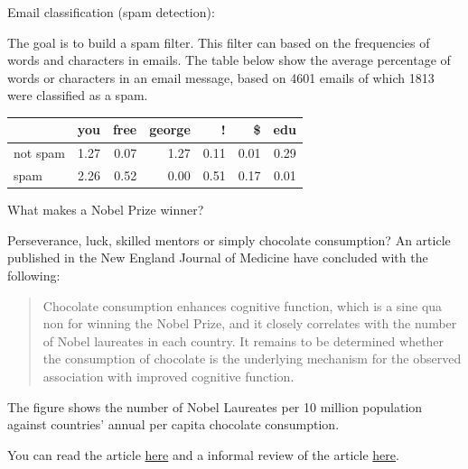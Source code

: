 \documentclass[ignorenonframetext,]{beamer}
\begin{document}
\begin{frame}

\begin{block}{Email classification (spam detection):}

The goal is to build a spam filter. This filter can based on the
frequencies of words and characters in emails. The table below show the
average percentage of words or characters in an email message, based on
4601 emails of which 1813 were classified as a spam.

\begin{longtable}[]{@{}lrrrrrr@{}}
\toprule
& you & free & george & ! & \$ & edu\tabularnewline
\midrule
\endhead
not spam & 1.27 & 0.07 & 1.27 & 0.11 & 0.01 & 0.29\tabularnewline
spam & 2.26 & 0.52 & 0.00 & 0.51 & 0.17 & 0.01\tabularnewline
\bottomrule
\end{longtable}

\end{block}

\end{frame}

\begin{frame}

\begin{block}{What makes a Nobel Prize winner?}

Perseverance, luck, skilled mentors or simply chocolate consumption? An
article published in the New England Journal of Medicine have concluded
with the following:

\begin{quote}
Chocolate consumption enhances cognitive function, which is a sine qua
non for winning the Nobel Prize, and it closely correlates with the
number of Nobel laureates in each country. It remains to be determined
whether the consumption of chocolate is the underlying mechanism for the
observed association with improved cognitive function.
\end{quote}

The figure shows the number of Nobel Laureates per 10 million population
against countries' annual per capita chocolate consumption.

You can read the article
\href{http://www.nejm.org/doi/full/10.1056/NEJMon1211064}{here} and a
informal review of the article
\href{https://blogs.scientificamerican.com/the-curious-wavefunction/chocolate-consumption-and-nobel-prizes-a-bizarre-juxtaposition-if-there-ever-was-one/}{here}.

\end{block}

\end{frame}
\end{document}

